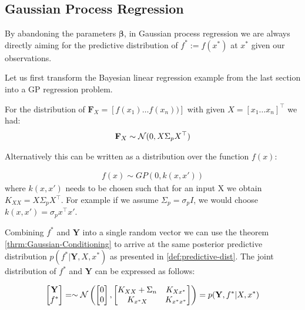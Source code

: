 \subsection{Gaussian Process Regression}
By abandoning the parameters $\boldsymbol{\beta}$, in Gaussian process regression we are always
directly aiming for the predictive distribution of
$f^{\ast} := f(x^{\ast})$ at $x^{\ast}$ given our observations.

Let us first transform the Bayesian linear regression example from the last section
into a GP regression problem.

For the distribution of $\mathbf{F}_X = [f(x_1) \dots f(x_n))]$ with given $X = [x_1 \dots x_n]^{\top}$ we had:
\begin{gather*}
    \mathbf{F}_X \sim \operatorname{\mathcal{N}}(0,  X \Sigma_p X^{\top})
\end{gather*}

Alternatively this can be written as a distribution over the function $f(x)$:

\begin{gather*}
    f(x) \sim GP(0, k(x, x'))
\end{gather*}
where $k(x,x')$ needs to be chosen such that for an input X we obtain $K_{XX} =  X \Sigma_p X^{\top}$.
For example if we assume $\Sigma_p = \sigma_p I$, we would choose $k(x,x') = \sigma_p x^{\top} x'$.

%


Combining $f^{\ast}$ and $\mathbf{Y}$ into a single random vector we can use the theorem \ref{thrm:Gaussian-Conditioning}
to arrive at the same posterior predictive distribution
$p(f^{\ast} | \mathbf{Y}, X, x^{\ast})$ as presented in \ref{def:predictive-dist}.
The joint distribution of $f^{\ast}$ and $\mathbf{Y}$ can be expressed as follows:

\begin{gather}
    \begin{bmatrix}
        \mathbf{Y} \\
        f^{\ast}
    \end{bmatrix} =
    \sim \operatorname{\mathcal{N}} \left(
        \begin{bmatrix}
        0 \\
        0
        \end{bmatrix},
        \begin{bmatrix}
        K_{XX} + \Sigma_n & K_{Xx^{\ast}} \\
        K_{x^{\ast}X} & K_{x^{\ast}x^{\ast}}
        \end{bmatrix}
        \right)
    = p(\mathbf{Y}, f^{\ast}| X, x^{\ast})
\end{gather}

